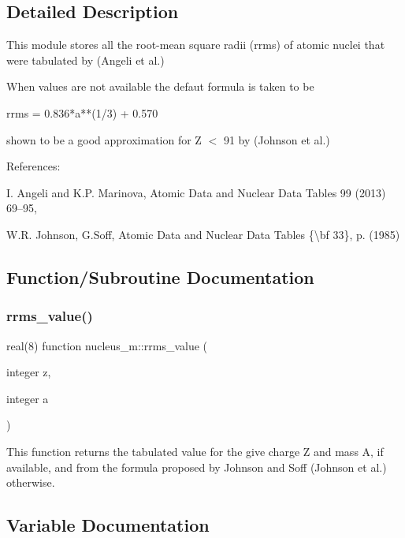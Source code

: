 \subsection{Detailed Description}
This module stores all the root-\/mean square radii (rrms) of atomic nuclei that were tabulated by (Angeli et al.) 

When values are not available the defaut formula is taken to be \begin{DoxyVerb}    rrms = 0.836*a**(1/3) + 0.570
\end{DoxyVerb}


shown to be a good approximation for Z $<$ 91 by (Johnson et al.)

References\+:

I. Angeli and K.\+P. Marinova, Atomic Data and Nuclear Data Tables 99 (2013) 69–95,

W.\+R. Johnson, G.\+Soff, Atomic Data and Nuclear Data Tables \{\textbackslash{}bf 33\}, p. (1985) 

\subsection{Function/\+Subroutine Documentation}
\mbox{\label{namespacenucleus__m_a83e8714be10756711874d134c66bcf73}} 
\subsubsection{\texorpdfstring{rrms\_value()}{rrms\_value()}}
{\footnotesize\ttfamily real(8) function nucleus\+\_\+m\+::rrms\+\_\+value (\begin{DoxyParamCaption}\item[{integer}]{z,  }\item[{integer}]{a }\end{DoxyParamCaption})}



This function returns the tabulated value for the give charge Z and mass A, if available, and from the formula proposed by Johnson and Soff (Johnson et al.) otherwise. 



\subsection{Variable Documentation}
\mbox{\label{namespacenucleus__m_ac8aa001386cf3938a2be5b5ec45d0c8d}} 
